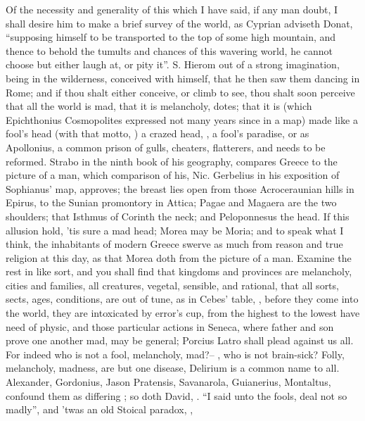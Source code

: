 Of the necessity and generality of this which I have said, if any man doubt, I
shall desire him to make a brief survey of the world, as
Cyprian adviseth Donat, \enquote{supposing himself to be
transported to the top of some high mountain, and thence to behold the tumults
and chances of this wavering world, he cannot choose but either laugh at, or
pity it}. S. Hierom out of a strong imagination, being in the wilderness,
conceived with himself, that he then saw them dancing in Rome; and if thou
shalt either conceive, or climb to see, thou shalt soon perceive that all the
world is mad, that it is melancholy, dotes; that it is (which Epichthonius
Cosmopolites expressed not many years since in a map) made like a fool's head
(with that motto, ) a crazed head, , a fool's paradise, or as Apollonius, a common prison of gulls,
cheaters, flatterers, \etc{} and needs to be reformed. Strabo in the ninth book
of his geography, compares Greece to the picture of a man, which comparison of
his, Nic. Gerbelius in his exposition of Sophianus' map, approves; the breast
lies open from those Acroceraunian hills in Epirus, to the Sunian promontory in
Attica; Pagae and Magaera are the two shoulders; that Isthmus of Corinth the
neck; and Peloponnesus the head. If this allusion hold, 'tis sure a mad head;
Morea may be Moria; and to speak what I think, the inhabitants of modern Greece
swerve as much from reason and true religion at this day, as that Morea doth
from the picture of a man. Examine the rest in like sort, and you shall find
that kingdoms and provinces are melancholy, cities and families, all creatures,
vegetal, sensible, and rational, that all sorts, sects, ages, conditions, are
out of tune, as in Cebes' table, , before they come
into the world, they are intoxicated by error's cup, from the highest to the
lowest have need of physic, and those particular actions in
Seneca, where father and son prove one another mad, may be
general; Porcius Latro shall plead against us all. For indeed who is not a
fool, melancholy, mad?-- , who
is not brain-sick? Folly, melancholy, madness, are but one disease, Delirium is
a common name to all. Alexander, Gordonius, Jason Pratensis, Savanarola,
Guianerius, Montaltus, confound them as differing ;
so doth David, . \enquote{I said unto the fools, deal not
so madly}, and 'twas an old Stoical paradox, ,
